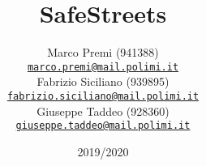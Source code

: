 \title{SafeStreets}
\author{
    Marco Premi (941388)\\[0cm]
    {\small \href{mailto:marco.premi@mail.polimi.it}{\texttt{marco.premi@mail.polimi.it}}}
    \\[0.5cm]
    Fabrizio Siciliano (939895)\\[0cm]
    {\small \href{mailto:fabrizio.siciliano@mail.polimi.it}{\texttt{fabrizio.siciliano@mail.polimi.it}}}
    \\[0.5cm]
    Giuseppe Taddeo (928360)\\[0cm]
    {\small \href{mailto:giuseppe.taddeo@mail.polimi.it}{\texttt{giuseppe.taddeo@mail.polimi.it}}}
}
\date{2019/2020}